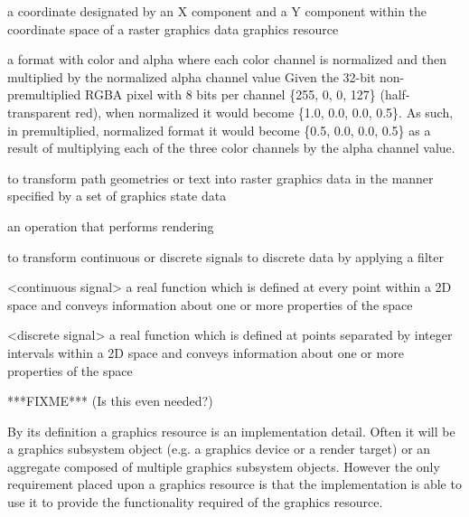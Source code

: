 a coordinate designated by an X component and a Y component within the 
coordinate space of a raster graphics data graphics resource

a format with color and alpha where each color channel is normalized and then 
multiplied by the normalized alpha channel value
\enterexample
Given the 32-bit non-premultiplied RGBA pixel with 8 bits per channel \{255, 0, 
0, 127\} (half-transparent red), when normalized it would become \{1.0, 0.0, 
0.0, 0.5\}. As such, in premultiplied, normalized format it would become \{0.5, 
0.0, 0.0, 0.5\} as a result of multiplying each of the three color channels by 
the alpha channel value.
\exitexample

to transform path geometries or text into raster graphics data in the manner specified by a set of graphics state data

an operation that performs rendering

to transform continuous or discrete signals to discrete data by applying
a filter

<continuous signal> a real function which is defined at every point within a 
2D space and conveys information about one or more properties of the space

<discrete signal> a real function which is defined at points separated by 
integer intervals within a 2D space and conveys information about one or more 
properties of the space

***FIXME*** (Is this even needed?)


\pnum
\enternote
By its definition a graphics resource is an implementation detail. Often it will be a graphics subsystem object (e.g. a graphics device or a render target) or an aggregate composed of multiple graphics subsystem objects. However the only requirement placed upon a graphics resource is that the implementation is able to use it to provide the functionality required of the graphics resource.
\exitnote

